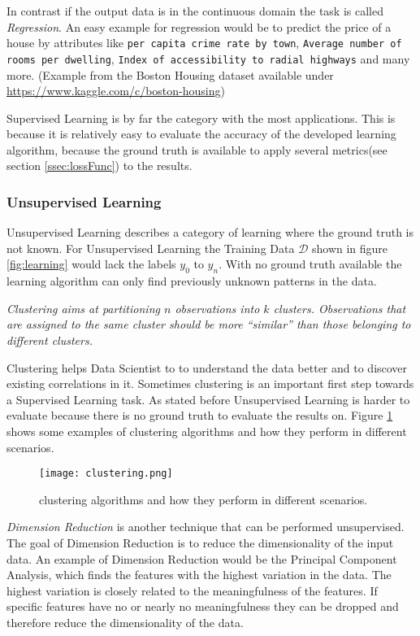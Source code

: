 In contrast if the output data is in the continuous domain the task is called \emph{Regression}.
An easy example for regression would be to predict the price of a house by attributes like \texttt{per capita crime rate by town}, \texttt{Average number of rooms per dwelling}, \texttt{Index of accessibility to radial highways} and many more. 
(Example from the Boston Housing dataset\cite{Harrison78} available under \url{https://www.kaggle.com/c/boston-housing}) 

Supervised Learning is by far the category with the most applications.
This is because it is relatively easy to evaluate the accuracy of the developed learning algorithm, because the ground truth is available to apply several metrics(see section \ref{ssec:lossFunc}) to the results.

\subsubsection{Unsupervised Learning}
Unsupervised Learning describes a category of learning where the ground truth is not known. 
For Unsupervised Learning the Training Data $\mathcal{D}$ shown in figure \ref{fig:learning} would lack the labels $y_0$ to $y_n$.
With no ground truth available the learning algorithm can only find previously unknown patterns in the data.

\emph{Clustering aims at partitioning $n$ observations into $k$ clusters.
Observations that are assigned to the same cluster should be more
“similar” than those belonging to different clusters.}\cite{LVDFKI}

Clustering helps Data Scientist to to understand the data better and to discover existing correlations in it.
Sometimes clustering is an important first step towards a Supervised Learning task. 
As stated before Unsupervised Learning is harder to evaluate because there is no ground truth to evaluate the results on.
Figure \ref{fig:clustering} shows some examples of clustering algorithms and how they perform in different scenarios.

\begin{figure}
\centering
  \texttt{[image: clustering.png]}
  \caption{clustering algorithms and how they perform in different scenarios.\cite{LVDFKI}}
  \label{fig:clustering}
\end{figure}

\emph{Dimension Reduction} is another technique that can be performed unsupervised.
The goal of Dimension Reduction is to reduce the dimensionality of the input data.
An example of Dimension Reduction would be the Principal Component Analysis, which finds the features with the highest variation in the data. The highest variation is closely related to the meaningfulness of the features. 
If specific features have no or nearly no meaningfulness they can be dropped and therefore reduce the dimensionality of the data.




